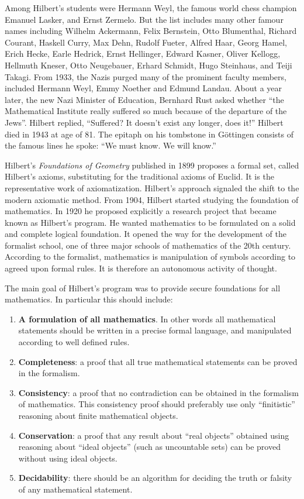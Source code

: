 \documentclass[b5paper]{article}
\begin{document}
Among Hilbert's students were Hermann Weyl, the famous world chess champion Emanuel Lasker, and Ernst Zermelo. But the list includes many other famour names including Wilhelm Ackermann, Felix Bernstein, Otto Blumenthal, Richard Courant, Haskell Curry, Max Dehn, Rudolf Fueter, Alfred Haar, Georg Hamel, Erich Hecke, Earle Hedrick, Ernst Hellinger, Edward Kasner, Oliver Kellogg, Hellmuth Kneser, Otto Neugebauer, Erhard Schmidt, Hugo Steinhaus, and Teiji Takagi. From 1933, the Nazis purged many of the prominent faculty members, included Hermann Weyl, Emmy Noether and Edmund Landau. About a year later, the new Nazi Minister of Education, Bernhard Rust asked whether ``the Mathematical Institute really suffered so much because of the departure of the Jews''. Hilbert replied, ``Suffered? It doesn't exist any longer, does it!'' Hilbert died in 1943 at age of 81. The epitaph on his tombstone in Göttingen consists of the famous lines he spoke: ``We must know. We will know.''

Hilbert's {\em Foundations of Geometry} published in 1899 proposes a formal set, called Hilbert's axioms, substituting for the traditional axioms of Euclid. It is the representative work of axiomatization. Hilbert's approach signaled the shift to the modern axiomatic method. From 1904, Hilbert started studying the foundation of mathematics. In 1920 he proposed explicitly a research project that became known as Hilbert's program. He wanted mathematics to be formulated on a solid and complete logical foundation. It opened the way for the development of the formalist school, one of three major schools of mathematics of the 20th century. According to the formalist, mathematics is manipulation of symbols according to agreed upon formal rules. It is therefore an autonomous activity of thought.

The main goal of Hilbert's program was to provide secure foundations for all mathematics. In particular this should include:

\begin{enumerate}
\item \textbf{A formulation of all mathematics}. In other words all mathematical statements should be written in a precise formal language, and manipulated according to well defined rules.

\item \textbf{Completeness}: a proof that all true mathematical statements can be proved in the formalism.
\item \textbf{Consistency}: a proof that no contradiction can be obtained in the formalism of mathematics. This consistency proof should preferably use only ``finitistic'' reasoning about finite mathematical objects.
\item \textbf{Conservation}: a proof that any result about ``real objects'' obtained using reasoning about ``ideal objects'' (such as uncountable sets) can be proved without using ideal objects.
\item \textbf{Decidability}: there should be an algorithm for deciding the truth or falsity of any mathematical statement.
\end{enumerate}
\end{document}
